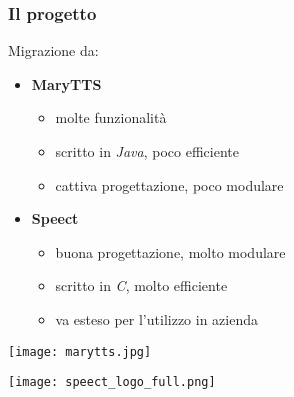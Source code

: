 \begin{frame}
  \frametitle{Il progetto}
  Migrazione da:
     \begin{itemize}
       \item \textbf{MaryTTS}
           \begin{itemize} 
              \item molte funzionalità
              \item scritto in \textit{Java}, poco efficiente
              \item cattiva progettazione, poco modulare
           \end{itemize}
       \item \textbf{Speect}
           \begin{itemize}  
             \item buona progettazione, molto modulare
             \item scritto in \textit{C}, molto efficiente
             \item va esteso per l'utilizzo in azienda
           \end{itemize}
     \end{itemize}
  \begin{flushleft}
  \texttt{[image: marytts.jpg]}
  \end{flushleft}
  
  \begin{flushright}
  \texttt{[image: speect\_logo\_full.png]}
  \end{flushright}
  
\end{frame}


